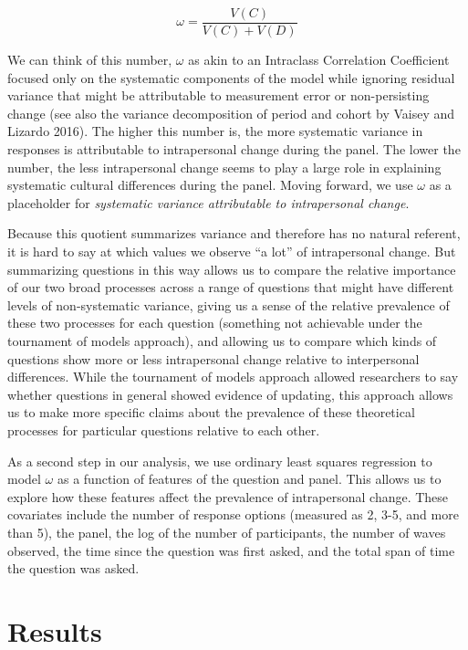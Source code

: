 \documentclass[
  12pt,
]{article}
\begin{document}
\[
\omega = \frac{V(C)}{V(C) + V(D)}
\]

We can think of this number, \(\omega\) as akin to an Intraclass
Correlation Coefficient focused only on the systematic components of the
model while ignoring residual variance that might be attributable to
measurement error or non-persisting change (see also the variance
decomposition of period and cohort by Vaisey and Lizardo 2016). The
higher this number is, the more systematic variance in responses is
attributable to intrapersonal change during the panel. The lower the
number, the less intrapersonal change seems to play a large role in
explaining systematic cultural differences during the panel. Moving
forward, we use \(\omega\) as a placeholder for \emph{systematic
variance attributable to intrapersonal change}.

Because this quotient summarizes variance and therefore has no natural
referent, it is hard to say at which values we observe ``a lot'' of
intrapersonal change. But summarizing questions in this way allows us to
compare the relative importance of our two broad processes across a
range of questions that might have different levels of non-systematic
variance, giving us a sense of the relative prevalence of these two
processes for each question (something not achievable under the
tournament of models approach), and allowing us to compare which kinds
of questions show more or less intrapersonal change relative to
interpersonal differences. While the tournament of models approach
allowed researchers to say whether questions in general showed evidence
of updating, this approach allows us to make more specific claims about
the prevalence of these theoretical processes for particular questions
relative to each other.

As a second step in our analysis, we use ordinary least squares
regression to model \(\omega\) as a function of features of the question
and panel. This allows us to explore how these features affect the
prevalence of intrapersonal change. These covariates include the number
of response options (measured as 2, 3-5, and more than 5), the panel,
the log of the number of participants, the number of waves observed, the
time since the question was first asked, and the total span of time the
question was asked.

\hypertarget{results}{%
\section{Results}\label{results}}
\end{document}
